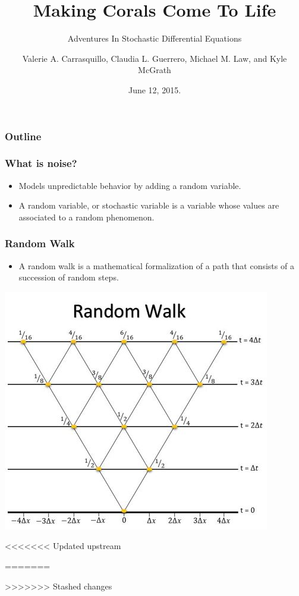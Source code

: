 \documentclass{beamer}
\begin{document}
\author{Valerie A. Carrasquillo, Claudia L. Guerrero, Michael M. Law, and Kyle McGrath}

\title{Making Corals Come To Life}
\subtitle{Adventures In Stochastic Differential Equations}
\date{June 12, 2015.}

\begin{frame}
  \titlepage
\end{frame}

\begin{frame}
  \frametitle{Outline}
  \tableofcontents
\end{frame}

\begin{frame}
  \frametitle{What is noise?}
  \begin{itemize}
  \item Models unpredictable behavior by adding a random variable.
  \item A random variable, or stochastic variable is a variable whose values are associated to a random phenomenon.
  \end{itemize}
\end{frame}

\begin{frame}
  \frametitle{Random Walk}
  \begin{itemize}
  \item A random walk is a mathematical formalization of a path that consists of a succession of random steps.
  \end{itemize}
  \centering
  \includegraphics[scale=0.67]{RandomWalk}
\end{frame}



<<<<<<< Updated upstream



=======





>>>>>>> Stashed changes
\end{document}
